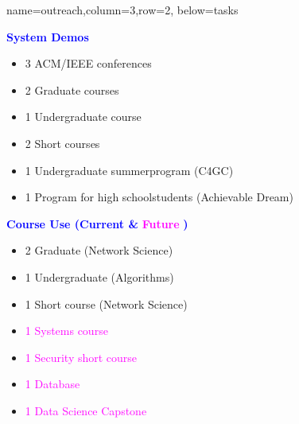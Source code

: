 \documentclass[landscape,paperwidth=70in,paperheight=46in,fontscale=0.225]{baposter} %
\begin{document}
\begin{poster}
          {name=outreach,column=3,row=2, below=tasks}{
\begin{minipage}[t]{0.48 \textwidth}
\textcolor{blue}{\textbf{System Demos}}
\medskip
\begin{itemize}[leftmargin=*,noitemsep,topsep=0pt]
    \item 3 ACM/IEEE conferences  \smallskip
    \item 2 Graduate courses   \smallskip 
    \item 1 Undergraduate course  \smallskip
    \item 2 Short courses  \smallskip
    \item 1 Undergraduate summer\newline program (C4GC)  \smallskip
    \item 1 Program for high school\newline students 
          (Achievable Dream) %
\end{itemize}
\end{minipage}
\quad
\begin{minipage}[t]{0.48 \textwidth}
\textcolor{blue}{\textbf{Course Use (Current \&}} \textcolor{magenta}{\textbf{Future}} \textcolor{blue}{\textbf{)}} 
  \medskip
\begin{itemize}[leftmargin=*,noitemsep,topsep=0pt]
    \item 2 Graduate (Network Science)    \smallskip
    \item 1 Undergraduate (Algorithms)   \smallskip
    \item 1 Short course (Network Science)   \smallskip
    \item \textcolor{magenta}{1 Systems course}  \smallskip
    \item \textcolor{magenta}{1 Security short course}  \smallskip
    \item \textcolor{magenta}{1 Database}  \smallskip
    \item \textcolor{magenta}{1 Data Science Capstone}
\end{itemize}
\end{minipage}
\qquad

\medskip

}
\end{poster}
\end{document}
